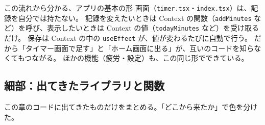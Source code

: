 \begin{kkbadgepoint}[要点]{この流れから分かる、アプリの基本の形}
  画面（\texttt{timer.tsx}・\texttt{index.tsx}）は、記録を自分では持たない。
  記録を変えたいときは Context の関数（\texttt{addMinutes} など）を呼び、表示したいときは Context の値（\texttt{todayMinutes} など）を受け取るだけ。
  保存は Context の中の \texttt{useEffect} が、値が変わるたびに自動で行う。
  だから「タイマー画面で足す」と「ホーム画面に出る」が、互いのコードを知らなくてもつながる。
  ほかの機能（疲労・設定）も、この同じ形でできている。
\end{kkbadgepoint}

\subsection{細部：出てきたライブラリと関数}

この章のコードに出てきたものだけをまとめる。「どこから来たか」で色を分けた。

